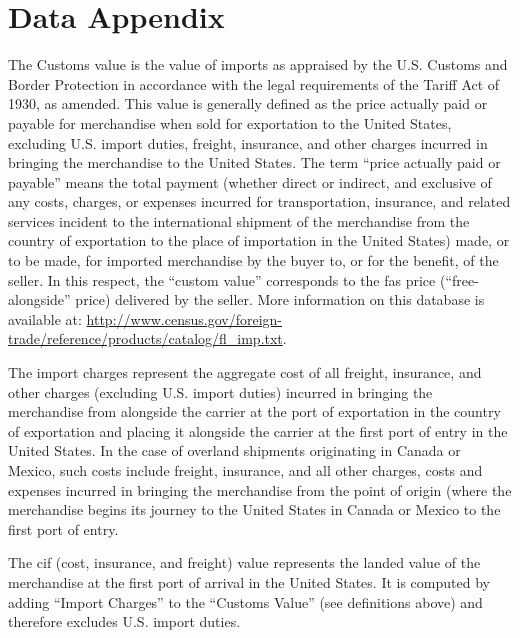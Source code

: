 \documentclass[a4paper,11pt]{article}
\begin{document}
\newpage


\appendix

\clearpage

\setcounter{table}{0}
\renewcommand{\thefigure}{A.\arabic{figure}}
\renewcommand{\thetable}{A.\arabic{table}}


\section{Data Appendix \label{app:data}}


The Customs value is the value of imports as appraised by the U.S.
Customs and Border Protection in accordance with the legal requirements of the Tariff Act of 1930, as amended.
This value is generally defined as the price actually paid or payable for merchandise when sold for exportation to the United States, excluding U.S.
import duties, freight, insurance, and other charges incurred in bringing the merchandise to the United States.
The term ``price actually paid or payable'' means the total payment (whether direct or indirect, and exclusive of any costs, charges, or expenses incurred for transportation, insurance, and related services incident to the international shipment of the merchandise from the country of exportation to the place of importation in the United States) made, or to be made, for imported merchandise by the buyer to, or for the benefit, of the seller.
In this respect, the ``custom value'' corresponds to the fas price (``free-alongside'' price) delivered by the seller.
More information on this database is available at: \url{http://www.census.gov/foreign-trade/reference/products/catalog/fl_imp.txt}.

The import charges represent the aggregate cost of all freight, insurance, and other charges (excluding U.S.
import duties) incurred in bringing the merchandise from alongside the carrier at the port of exportation in the country of exportation and placing it alongside the carrier at the first port of entry in the United States.
In the case of overland shipments originating in Canada or Mexico, such costs include freight, insurance, and all other charges, costs and expenses incurred in bringing the merchandise from the point of origin (where the merchandise begins its journey to the United States in Canada or Mexico to the first port of entry.

The cif (cost, insurance, and freight) value represents the landed value of the merchandise at the first port of arrival in the United States.
It is computed by adding ``Import Charges'' to the ``Customs Value'' (see definitions above) and therefore excludes U.S.
import duties.
\end{document}
